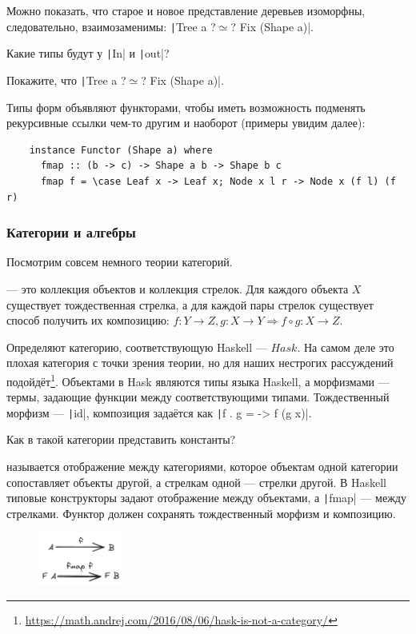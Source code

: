 Можно показать, что старое и новое представление деревьев изоморфны, следовательно, взаимозаменимы: \texttt|Tree a ?$\simeq$? Fix (Shape a)|.

\begin{task}
    Какие типы будут у \texttt|In| и \texttt|out|?
\end{task}

\begin{task}
    Покажите, что \texttt|Tree a ?$\simeq$? Fix (Shape a)|.
\end{task}

Типы форм объявляют функторами, чтобы иметь возможность подменять рекурсивные ссылки чем-то другим и наоборот (примеры увидим далее):
\begin{verbatim}
    instance Functor (Shape a) where
      fmap :: (b -> c) -> Shape a b -> Shape b c
      fmap f = \case Leaf x -> Leaf x; Node x l r -> Node x (f l) (f r)
\end{verbatim}

\subsubsection{Категории и алгебры}

Посмотрим совсем немного теории категорий.

 --- это коллекция объектов и коллекция стрелок.
Для каждого объекта $X$ существует тождественная стрелка, а для каждой пары стрелок существует способ получить их композицию: $f : Y \to Z, g : X \to Y \Rightarrow f \circ g : X \to Z$.

Определяют категорию, соответствующую Haskell --- $Hask$.
На самом деле это плохая категория с точки зрения теории, но для наших нестрогих рассуждений подойдёт\footnote{\url{https://math.andrej.com/2016/08/06/hask-is-not-a-category/}}.
Объектами в Hask являются типы языка Haskell, а морфизмами --- термы, задающие функции между соответствующими типами.
Тождественный морфизм --- \texttt|id|, композиция задаётся как \texttt|f . g = \x -> f (g x)|.

\begin{task}
    Как в такой категории представить константы?
\end{task}


 называется отображение между категориями, которое объектам одной категории сопоставляет объекты другой, а стрелкам одной --- стрелки другой.
В Haskell типовые конструкторы задают отображение между объектами, а \texttt|fmap| --- между стрелками.
Функтор должен сохранять тождественный морфизм и композицию.
\begin{figure}[h!]
    \centering
    \includegraphics[width=0.25\textwidth]{figs/functor}
\end{figure}

